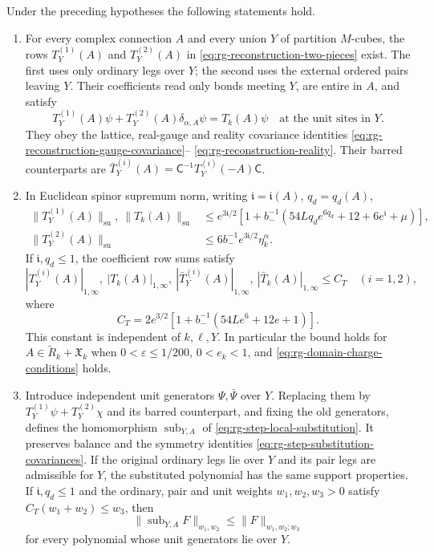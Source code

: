 \begin{theorem}\label{thm:reconstruction}
Under the preceding hypotheses the following statements hold.
\begin{enumerate}[label=\textup{(\roman*)},leftmargin=*]
\item For every complex connection \(A\) and every union \(Y\) of
partition \(M\)-cubes, the rows \(T_Y^{(1)}(A)\) and
\(T_Y^{(2)}(A)\) in \eqref{eq:rg-reconstruction-two-pieces} exist.
The first uses only ordinary legs over \(Y\); the second uses
the external ordered pairs leaving \(Y\). Their coefficients
read only bonds meeting \(Y\), are entire in \(A\), and satisfy
\[
 T_Y^{(1)}(A)\psi+T_Y^{(2)}(A)\delta_{\alpha,A}\psi
                       =T_k(A)\psi
 \quad\text{at the unit sites in }Y.
\]
They obey the lattice, real-gauge and reality covariance
identities \eqref{eq:rg-reconstruction-gauge-covariance}--%
\eqref{eq:rg-reconstruction-reality}. Their barred counterparts
are \(\bar T_Y^{(i)}(A)=\mathsf C^{-1}T_Y^{(i)}(-A)\mathsf C\).

\item In Euclidean spinor supremum norm, writing
\(\mathfrak i=\mathfrak i(A)\), \(q_d=q_d(A)\),
\begin{equation}\label{eq:rg-reconstruction-sup-estimate}
 \begin{aligned}
 \|T_Y^{(1)}(A)\|_{\mathrm{su}},\ \|T_k(A)\|_{\mathrm{su}}
 &\le e^{3\mathfrak i/2}
       [1+b_-^{-1}(54Lq_de^{6q_d}+12+6e^{\mathfrak i}+\mu)],\\
 \|T_Y^{(2)}(A)\|_{\mathrm{su}}
 &\le6b_-^{-1}e^{3\mathfrak i/2}\eta_k^\alpha .
 \end{aligned}
\end{equation}
If \(\mathfrak i,q_d\le1\), the coefficient row sums satisfy
\begin{equation}\label{eq:rg-reconstruction-coefficient-bound}
 |T_Y^{(i)}(A)|_{1,\infty},\ |T_k(A)|_{1,\infty},\
 |\bar T_Y^{(i)}(A)|_{1,\infty},\ |\bar T_k(A)|_{1,\infty}
 \le C_T\quad(i=1,2),
\end{equation}
where
\[
 C_T=2e^{3/2}[1+b_-^{-1}(54Le^6+12e+1)].
\]
This constant is independent of \(k,\ell,Y\). In particular
the bound holds for \(A\in\widetilde R_k+\mathfrak X_k\)
when \(0<\varepsilon\le1/200\), \(0<e_k<1\), and
\eqref{eq:rg-domain-charge-conditions} holds.

\item Introduce independent unit generators \(\Psi,\bar\Psi\)
over \(Y\). Replacing them by
\(T_Y^{(1)}\psi+T_Y^{(2)}\chi\) and its barred counterpart,
and fixing the old generators, defines the homomorphism
\(\operatorname{sub}_{Y,A}\) of
\eqref{eq:rg-step-local-substitution}. It preserves balance
and the symmetry identities
\eqref{eq:rg-step-substitution-covariances}.
If the original ordinary legs lie over \(Y\) and its pair legs
are admissible for \(Y\), the substituted polynomial has the same
support properties.
If \(\mathfrak i,q_d\le1\) and the ordinary, pair and unit
weights \(w_1,w_2,w_3>0\) satisfy
\(C_T(w_1+w_2)\le w_3\), then
\[
 \|\operatorname{sub}_{Y,A}F\|_{w_1,w_2}
                       \le\|F\|_{w_1,w_2;w_3}
\]
for every polynomial whose unit generators lie over \(Y\).


\end{enumerate}
\end{theorem}
